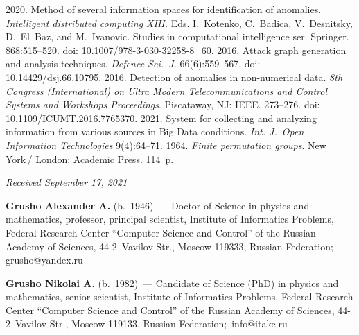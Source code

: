 \begin{multicols}{2}
{{\begin{thebibliography}{99}
 2020. Method of several information spaces for 
identification of anomalies. \textit{Intelligent distributed computing XIII.} Eds. I.~Kotenko, 
C.~Badica, V.~Desnitsky, D.~El~Baz, and M.~Ivanovic. Studies in computational intelligence ser. 
Springer. 868:515--520. doi: 10.1007/978-3-030-32258-8\_60.
 2016. Attack graph generation and analysis 
techniques. \textit{Defence Sci.~J.} 66(6):559--567. doi: 10.14429/dsj.66.10795.
 2016. Detection of anomalies in non-numerical data. 
\textit{8th Congress (International) on Ultra Modern Telecommunications and Control Systems and 
Workshops Proceedings}. Piscataway, NJ: IEEE. 273--276. doi: 10.1109/ICUMT.2016.7765370.
 2021. System for 
collecting and analyzing information from various sources in Big Data conditions. \textit{Int. J.~Open 
Information Technologies} 9(4):64--71.
 1964. \textit{Finite permutation groups}. New York\,/ London: Academic Press. 
114~p.
\end{thebibliography}

 }
 }

\end{multicols}

\vspace*{-3pt}

\hfill{\small\textit{Received September 17, 2021}}



\Contr

\noindent
\textbf{Grusho Alexander A.} (b.\ 1946)~--- Doctor of Science in physics and mathematics, professor, 
principal scientist, Institute of Informatics Problems, Federal Research Center ``Computer Science and 
Control'' of the Russian Academy of Sciences, 44-2~Vavilov Str., Moscow 119333, Russian 
Federation; \mbox{grusho@yandex.ru}

\vspace*{3pt}

\noindent
\textbf{Grusho Nikolai A.} (b.\ 1982)~--- Candidate of Science (PhD) in physics and mathematics, 
senior scientist, Institute of Informatics Problems, Federal Research Center ``Computer Science and 
Control'' of the Russian Academy of Sciences, 44-2~Vavilov Str., Moscow 119133, Russian 
\mbox{Federation; info@itake.ru}

